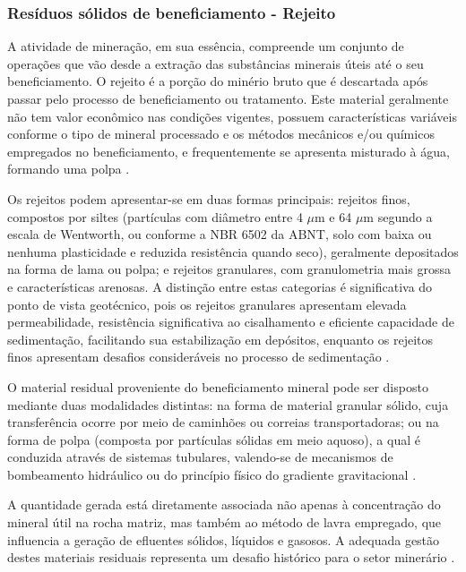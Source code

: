 \subsubsection{Resíduos sólidos de beneficiamento - Rejeito}

A atividade de mineração, em sua essência, compreende um conjunto de operações que vão desde a extração das substâncias minerais úteis até o seu beneficiamento. O rejeito é a porção do minério bruto que é descartada após passar pelo processo de beneficiamento ou tratamento. Este material geralmente não tem valor econômico nas condições vigentes, possuem características variáveis conforme o tipo de mineral processado e os métodos mecânicos e/ou químicos empregados no beneficiamento, e frequentemente se apresenta misturado à água, formando uma polpa \cite{freire2020}.

Os rejeitos podem apresentar-se em duas formas principais: rejeitos finos, compostos por siltes (partículas com diâmetro entre 4 $\mu$m e 64 $\mu$m segundo a escala de Wentworth, ou conforme a NBR 6502 da ABNT, solo com baixa ou nenhuma plasticidade e reduzida resistência quando seco), geralmente depositados na forma de lama ou polpa; e rejeitos granulares, com granulometria mais grossa e características arenosas. A distinção entre estas categorias é significativa do ponto de vista geotécnico, pois os rejeitos granulares apresentam elevada permeabilidade, resistência significativa ao cisalhamento e eficiente capacidade de sedimentação, facilitando sua estabilização em depósitos, enquanto os rejeitos finos apresentam desafios consideráveis no processo de sedimentação \cite{carvalho2018}.

O material residual proveniente do beneficiamento mineral pode ser disposto mediante duas modalidades distintas: na forma de material granular sólido, cuja transferência ocorre por meio de caminhões ou correias transportadoras; ou na forma de polpa (composta por partículas sólidas em meio aquoso), a qual é conduzida através de sistemas tubulares, valendo-se de mecanismos de bombeamento hidráulico ou do princípio físico do gradiente gravitacional \cite{duarte2008}.

A quantidade gerada está diretamente associada não apenas à concentração do mineral útil na rocha matriz, mas também ao método de lavra empregado, que influencia a geração de efluentes sólidos, líquidos e gasosos. A adequada gestão destes materiais residuais representa um desafio histórico para o setor minerário \cite{carvalho2018}.

